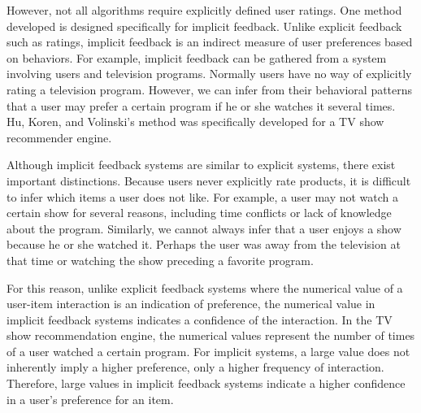 \documentclass[twocolumn]{article}
\begin{document}
However, not all algorithms require explicitly 
defined user ratings. One method developed \cite{hu2008collaborative} is 
designed specifically for implicit feedback. 
Unlike explicit feedback such as ratings, implicit feedback is an 
indirect measure of user preferences based on behaviors. For example, 
implicit feedback can be gathered from a system involving 
users and television programs. Normally users have no way of explicitly
rating a television program. However, we can 
infer from their behavioral patterns that a user may prefer a certain 
program if he or she watches it several times. Hu, Koren, and Volinski's method was specifically developed for a TV show 
recommender engine\cite{hu2008collaborative}.

Although implicit feedback systems are similar to explicit systems, 
there exist important distinctions. Because users never explicitly rate 
products, it is difficult to infer which items a user does not like. 
For example, a user may not watch a certain show for several reasons, 
including time conflicts or lack of knowledge about the program. 
Similarly, we cannot always infer that a user enjoys a show because he or 
she watched it.  Perhaps the user was away from the television at that 
time or watching the show preceding a favorite program.
       
For this reason, unlike explicit feedback systems where the numerical 
value of a user-item interaction is an indication of preference, the 
numerical value in implicit feedback systems indicates a confidence of 
the interaction. In the TV show recommendation engine, the numerical
values represent the number of times of a user watched a certain program.
For implicit systems, a large value does not inherently imply a 
higher preference, only a higher frequency of interaction. 
Therefore, large values in implicit feedback systems indicate a higher confidence
in a user's preference for an item. 
\end{document}
